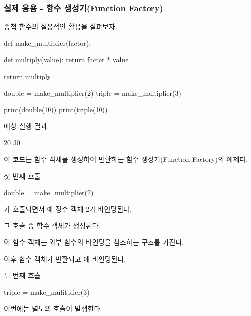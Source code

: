 \subsubsection{실제 응용 - 함수 생성기(Function Factory)}

중첩 함수의 실용적인 활용을 살펴보자.

\begin{dhkcode}
def make_multiplier(factor):

    def multiply(value):
        return factor * value

    return multiply


double = make_multiplier(2)
triple = make_multiplier(3)

print(double(10))
print(triple(10))
\end{dhkcode}

예상 실행 결과:

\begin{dhkzsh}
20
30
\end{dhkzsh}

이 코드는 함수 객체를 생성하여 반환하는 함수 생성기(Function Factory)의 예제다.

\begin{dhknote}
\begin{dhksmry}[centered]
첫 번째 호출
\end{dhksmry}
\end{dhknote}

\begin{dhkcode}
double = make_multiplier(2)
\end{dhkcode}

가 호출되면서 에 정수 객체 2가 바인딩된다.

그 호출 중  함수 객체가 생성된다.

이 함수 객체는 외부 함수의  바인딩을 참조하는 구조를 가진다.

이후  함수 객체가 반환되고 에 바인딩된다.

\begin{dhknote}
\begin{dhksmry}[centered]
두 번째 호출
\end{dhksmry}
\end{dhknote}

\begin{dhkcode}
triple = make_mulitplier(3)
\end{dhkcode}

이번에는 별도의  호출이 발생한다.

